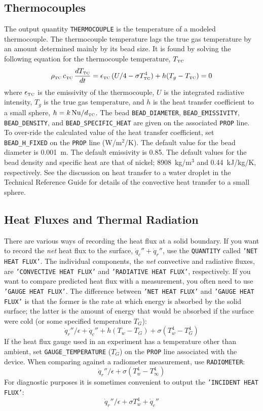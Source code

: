 \documentclass[11pt]{book}
\newcommand{\ct}{\tt\small}
\newcommand{\dq}{\dot{q}}
\newcommand{\be}{\begin{equation}}
\newcommand{\ee}{\end{equation}}
\newcommand{\NU}{\hbox{Nu}}
\begin{document}
\subsection{Thermocouples}
\label{info:THERMOCOUPLE}

The output quantity {\ct THERMOCOUPLE} is the temperature of a modeled thermocouple. The thermocouple temperature lags the true gas temperature by an amount determined mainly
by its bead size. It is found by solving the following equation for the thermocouple temperature, $T_{\hbox{\tiny TC}}$~\cite{Welsh:1}
\be
   \rho_{\hbox{\tiny TC}} \, c_{\hbox{\tiny TC}} \, \frac{dT_{\hbox{\tiny TC}}}{dt} = \epsilon_{\hbox{\tiny TC}} \, (U/4 - \sigma T_{\hbox{\tiny TC}}^4) + h(T_g - T_{\hbox{\tiny TC}}) = 0
   \label{TC}
\ee
where $\epsilon_{\hbox{\tiny TC}}$ is the emissivity of the thermocouple, $U$ is the integrated radiative intensity, $T_g$ is the true gas temperature, and
$h$ is the heat transfer coefficient to a small sphere,
$h=k \, \NU / d_{\hbox{\tiny TC}}$.
The bead {\ct BEAD\_DIAMETER}, {\ct BEAD\_EMISSIVITY}, {\ct BEAD\_DENSITY}, and {\ct BEAD\_SPECIFIC\_HEAT} are given on the associated {\ct PROP} line. To over-ride the
calculated value of the heat transfer coefficient, set {\ct BEAD\_H\_FIXED} on the {\ct PROP} line (W/m$^2$/K).
The default value for the bead diameter is 0.001~m. The default emissivity is 0.85. The default values for the bead density and specific heat are that of nickel; 8908~kg/m$^3$ and
0.44~kJ/kg/K, respectively.
See the discussion on heat transfer to a water
droplet in the Technical Reference Guide for details of the convective
heat transfer to a small sphere.


\subsection{Heat Fluxes and Thermal Radiation}
\label{info:heat_flux}

There are various ways of recording the heat flux at a solid
boundary. If you want to record the {\em net} heat flux to the
surface, $\dq_c'' + \dq_r''$, use the {\ct QUANTITY} called {\ct 'NET HEAT FLUX'}. The individual components, the {\em net} convective and
radiative fluxes, are {\ct 'CONVECTIVE HEAT FLUX'} and {\ct 'RADIATIVE HEAT FLUX'}, respectively. If you want to compare predicted heat
flux with a measurement, you often need to use {\ct 'GAUGE HEAT FLUX'}.
The difference between {\ct 'NET HEAT FLUX'} and {\ct 'GAUGE HEAT FLUX'} is that
the former is the rate at which energy is absorbed by the solid surface;
the latter is the amount of energy that would be absorbed if the surface were cold (or some specified temperature $T_G$):
$$\dq_r''/\epsilon +\dq_c'' + h(T_w-T_G) + \sigma (T_w^4-T_G^4)$$
If the heat flux gauge used in an experiment has a temperature other
than ambient, set {\ct GAUGE\_TEMPERATURE} ($T_G$) on the {\ct PROP} line
associated with the device.  When comparing against a radiometer
measurement, use {\ct RADIOMETER}:
$$\dq_r''/\epsilon + \sigma (T_w^4-T_\infty^4) $$
For diagnostic purposes it is sometimes convenient to output the {\ct 'INCIDENT HEAT FLUX'}:
$$ \dq_r''/\epsilon + \sigma T_w^4 +\dq_c'' $$
\end{document}

